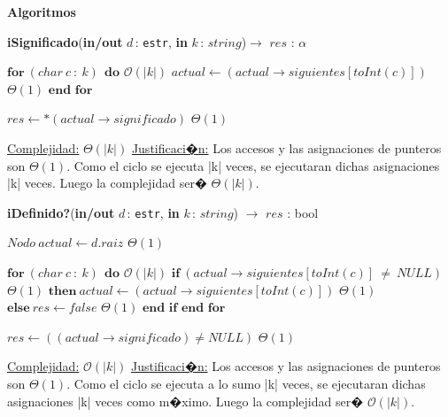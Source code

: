 \documentclass[a4paper,10pt]{article}
\let\TipoVariable=\texttt
\let\ModificadorArgumento=\textbf
\newcommand{\tab}{\hspace*{7mm}}
\newcommand{\ttab}{\tab \tab}
\newcommand{\In}[2]{\ModificadorArgumento{in} \ensuremath{#1}\,: \TipoVariable{#2}\xspace}
\newcommand{\Inout}[2]{\ModificadorArgumento{in/out} \ensuremath{#1}\,: \TipoVariable{#2}\xspace}
\newenvironment{Algoritmos}{%
  \vspace*{2ex}%
  \noindent\textbf{\Large Algoritmos}%
  \vspace*{2ex}%
}{}
\newcommand{\DRef}{\ensuremath{\rightarrow}}
\newcommand{\BigO}{\ensuremath{\mathcal{O}}}
\begin{document}
{\begin{Algoritmos}
\begin{algorithm}[H]{\textbf{iSignificado}(\Inout{d}{estr}, \In{k}{$string$})$\to$ $res$ : $\alpha$}
\begin{algorithmic}[1]
        \State $\textbf{for} \ (char \ c \ : \ k) \ \ \textbf{do}$                               \Comment $\BigO(|k|)$  
        \State \tab $actual \gets (actual \DRef siguientes [toInt(c)])$       \Comment $\Theta(1)$
        \State $\textbf{end for}$                                    

        \State $res \gets *(actual \DRef significado)$                                            \Comment $\Theta(1)$

          \medskip
          \Statex \underline{Complejidad:} $\Theta(|k|)$
          \Statex \underline{Justificaci�n:} Los accesos y las asignaciones de punteros son $\Theta(1)$. Como el ciclo se ejecuta |k| veces, se ejecutaran dichas asignaciones |k| veces. Luego la complejidad ser� $\Theta(|k|)$.
          \end{algorithmic}
    \end{algorithm}


    \begin{algorithm}[H]{\textbf{iDefinido?}(\Inout{d}{estr}, \In{k}{$string$}) $\to$ $res$ : bool}
      \begin{algorithmic}[1]
           \State $Nodo \ actual \gets d.raiz$                                                      \Comment $\Theta(1)$

           \State $\textbf{for} \ (char \ c \ : \ k) \ \ \textbf{do}$                               \Comment $\BigO(|k|)$  
           \State \tab  $\textbf{if} \ (actual \DRef siguientes [toInt(c)] \ \neq  \ NULL) $        \Comment $\Theta(1)$
           \State \ttab   $\textbf{then} \ actual \gets (actual \DRef siguientes [toInt(c)])$       \Comment $\Theta(1)$
           \State \ttab  $\textbf{else} \ res \gets false$                                           \Comment $\Theta(1)$
           \State \tab $\textbf{end if}$
           \State $\textbf{end for}$                                    

           \State $res \gets ((actual \DRef significado) \neq NULL)$                                                                  \Comment $\Theta(1)$

          \medskip
          \Statex \underline{Complejidad:} $\BigO(|k|)$
          \Statex \underline{Justificaci�n:} Los accesos y las asignaciones de punteros son $\Theta(1)$. Como el ciclo se ejecuta a lo sumo |k| veces, se ejecutaran dichas asignaciones |k| veces como m�ximo. Luego la complejidad ser� $\BigO(|k|)$.
          \end{algorithmic}
    \end{algorithm}


\end{Algoritmos}}
\end{document}
